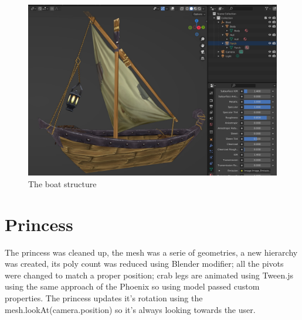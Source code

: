 \documentclass[10pt,a4paper]{article}
\begin{document}
\begin{figure}[H]
\centering
\caption{The boat structure}
\includegraphics[width=1\textwidth]{boat}
\end{figure}


\section{Princess}

The princess was cleaned up, the mesh was a serie of geometries, a new hierarchy was created, its poly count was reduced using Blender modifier; all the pivots were changed to match a proper position; crab legs are animated using Tween.js using the same approach of the Phoenix so using model passed custom properties. The princess updates it's rotation using the mesh.lookAt(camera.position) so it's always looking towards the user.
\end{document}
